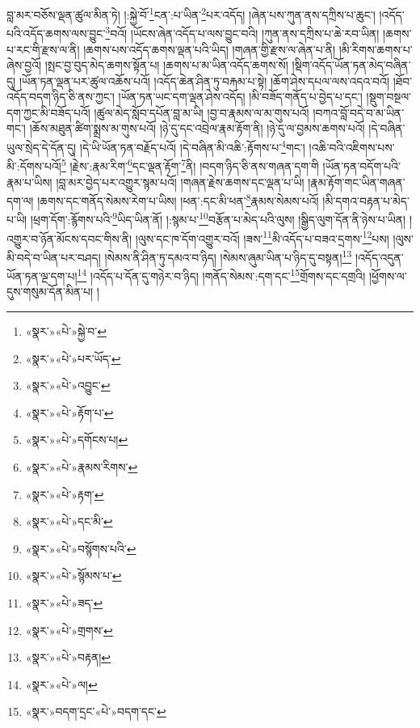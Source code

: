 \documentclass[12pt,a4paper]{book}
\begin{document}
བླ་མར་བཅོས་ལྡན་ཚུལ་མིན་ཏེ། །:སྐྱེ་བོ་\footnote{«སྣར་»«པེ་»སྐྱེ་བ་}ངན་:པ་ཡིན་\footnote{«སྣར་»«པེ་»པར་ཡོད་}པར་འདོད། །ཞེན་པས་ཀུན་ནས་དཀྲིས་པ་ཆུང་། །འདོད་པའི་འདོད་ཆགས་ལས་བྱུང་\footnote{«སྣར་»«པེ་»འབྱུང་}བའོ། །ཡོངས་ཞེན་འདོད་པ་ལས་བྱུང་བའི། །ཀུན་ནས་དཀྲིས་པ་ཆེ་རབ་ཡིན། །ཆགས་པ་རང་གི་རྫས་ལ་ནི། །ཆགས་པས་འདོད་ཆགས་ལྡན་པའི་ཡིད། །གཞན་གྱི་རྫས་ལ་ཞེན་པ་ནི། །མི་རིགས་ཆགས་པ་ཞེས་བྱའོ། །སྤང་བྱ་བུད་མེད་ཆགས་སྟོན་པ། །ཆགས་པ་མ་ཡིན་འདོད་ཆགས་སོ། །སྡིག་འདོད་ཡོན་ཏན་མེད་བཞིན་དུ། །ཡོན་ཏན་ལྡན་པར་ཚུལ་འཆོས་པའོ། །འདོད་ཆེན་ཤིན་ཏུ་བརྐམ་པ་སྟེ། །ཆོག་ཤེས་དཔལ་ལས་འདའ་བའོ། །ཐོབ་འདོད་བདག་ཉིད་ཅི་ནས་ཀྱང་། །ཡོན་ཏན་ཡང་དག་ལྡན་ཤེས་འདོད། །མི་བཟོད་གནོད་པ་བྱེད་པ་དང་། །སྡུག་བསྔལ་དག་ཀྱང་མི་བཟོད་པའོ། །ཚུལ་མེད་སློབ་དཔོན་བླ་མ་ཡི། །བྱ་བ་རྣམས་ལ་མ་གུས་པའོ། །བཀའ་བློ་བདེ་བ་མ་ཡིན་གང་། །ཆོས་མཐུན་ཚིག་སྨྲས་མ་གུས་པའོ། །ཉེ་དུ་དང་འབྲེལ་རྣམ་རྟོག་ནི། །ཉེ་དུ་ལ་བྱམས་ཆགས་པའོ། །དེ་བཞིན་ཡུལ་སྲེད་དེ་དོན་དུ། །དེ་ཡི་ཡོན་ཏན་བརྗོད་པའོ། །དེ་བཞིན་མི་འཆི་:རྟོགས་པ་\footnote{«སྣར་»«པེ་»རྟོག་པ་}གང་། །འཆི་བའི་འཇིགས་པས་མི་:དོགས་པའོ།\footnote{«སྣར་»«པེ་»དགོངས་པ།} །རྗེས་:རྣམ་རིག་\footnote{«སྣར་»«པེ་»རྣམས་རིགས་}དང་ལྡན་རྟོག་\footnote{«སྣར་»«པེ་»རྟག་}ནི། །བདག་ཉིད་ཅི་ནས་གཞན་དག་གི །ཡོན་ཏན་བདོག་པའི་རྣམ་པ་ཡིས། །བླ་མར་བྱེད་པར་འགྱུར་སྙམ་པའོ། །གཞན་རྗེས་ཆགས་དང་ལྡན་པ་ཡི། །རྣམ་རྟོག་གང་ཡིན་གཞན་དག་ལ། །ཆགས་དང་གནོད་སེམས་རེག་པ་ཡིས། །ཕན་:དང་མི་ཕན་\footnote{«སྣར་»«པེ་»དང་མི་}རྣམས་སེམས་པའོ། །མི་དགའ་བརྟན་པ་མེད་པ་ཡི། །ཕྲག་དོག་:རྙོགས་པའི་\footnote{«སྣར་»«པེ་»བསྙོགས་པའི་}ཡིད་ཡིན་ནོ། །:སྙམ་པ་\footnote{«སྣར་»«པེ་»སྙོམས་པ་}བརྩོན་པ་མེད་པའི་ལུས། །སྒྱིད་ལུག་དོན་ནི་ཉེས་པ་ཡིན། །འགྱུར་བ་ཉོན་མོངས་དབང་གིས་ནི། །ལུས་དང་ཁ་དོག་འགྱུར་བའོ། །ཟས་\footnote{«སྣར་»«པེ་»ཟད་}མི་འདོད་པ་བཟའ་དྲགས་\footnote{«སྣར་»«པེ་»གྲགས་}པས། །ལུས་མི་བདེ་བ་ཡིན་པར་བཤད། །སེམས་ནི་ཤིན་ཏུ་དམའ་བ་ཉིད། །སེམས་ཞུམ་ཡིན་པ་ཉིད་དུ་བསྟན།\footnote{«སྣར་»«པེ་»བརྟན།} །འདོད་འདུན་ཡོན་ཏན་ལྔ་དག་པ།\footnote{«སྣར་»«པེ་»ལ།} །འདོད་པ་དོན་དུ་གཉེར་བ་ཉིད། །གནོད་སེམས་:དག་དང་\footnote{«སྣར་»བདག་དྲང་«པེ་»བདག་དང་}གྲོགས་དང་དགྲའི། །ཕྱོགས་ལ་དུས་གསུམ་དོན་མིན་པ། །
\end{document}
